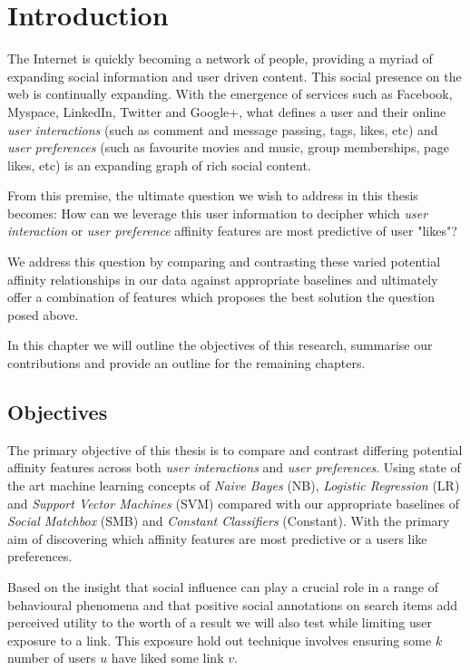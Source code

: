 
\chapter{Introduction}
\label{cha:intro}

The Internet is quickly becoming a network of people, providing a myriad of expanding social information and user driven content. 
This social presence on the web is continually expanding. With the emergence of services such as Facebook, Myspace, LinkedIn, Twitter 
and Google+, what defines a user and their online \emph{user interactions} (such as comment and message passing, tags, likes, etc) and \emph{user preferences} 
(such as favourite movies and music, group memberships, page likes, etc) is an expanding graph of rich social content. 

From this premise, the ultimate question we wish to address in this thesis becomes: 
How can we leverage this user information to decipher which \emph{user interaction} or \emph{user preference} affinity features 
are most predictive of user "likes"? 

We address this question by comparing and contrasting these varied potential affinity relationships in our data against appropriate 
baselines and ultimately offer a combination of features which proposes the best solution the question posed above.

In this chapter we will outline the objectives of this research, summarise our contributions and provide an outline for the remaining
chapters.

\section{Objectives}
\label{sec:objectives}

The primary objective of this thesis is to compare and contrast differing potential affinity features across both \emph{user interactions} and 
\emph{user preferences}. Using state of the art machine learning concepts of \emph{Naive Bayes} (NB), \emph{Logistic Regression} (LR) 
and \emph{Support Vector Machines} (SVM) compared with our appropriate baselines of \emph{Social Matchbox} (SMB) and \emph{Constant Classifiers} (Constant). 
With the primary aim of discovering which affinity features are most predictive or a users like preferences.

Based on the insight that social influence can play a crucial role in a range of behavioural phenomena \cite{grano,watts} and that
positive social annotations on search items add perceived utility to the worth of a result \cite{pantel} we will 
also test while limiting user exposure to a link. This exposure hold out technique involves ensuring some $k$ number of users $u$ have 
liked some link $v$.

